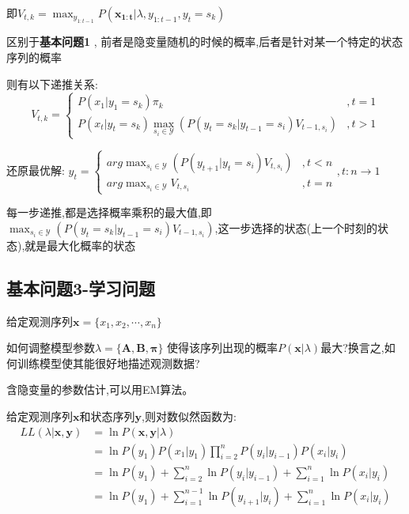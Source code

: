 \documentclass[UTF8,a4paper]{ctexart}%
\begin{document}
            即$V_{t,k} = \max_{y_{1:t-1}} P(\bm{x_{1:t}}|\lambda,y_{1:t-1} , y_t = s_k)$

            {\color{blue}
                区别于\textbf{基本问题1} , 前者是隐变量随机的时候的概率,后者是针对某一个特定的状态序列的概率
            }

            则有以下递推关系:
            \begin{equation}
                V_{t,k} = \begin{cases}
                  P(x_1|y_1 = s_k)\pi_k &,t = 1\\
                  P(x_t|y_t = s_k)\max_{s_i \in \mathcal{Y}}\left(P(y_t = s_k|y_{t-1} = s_i)V_{t-1,s_i}\right) &,t > 1
              \end{cases}
            \end{equation}

            还原最优解:
            $y_{t} = \begin{cases}
            arg \max_{s_i \in \mathcal{Y}}\left(P(y_{t+1}|y_{t} = s_i)V_{t,s_i}\right) & , t < n\\
            arg \max_{s_i \in \mathcal{Y}} V_{t,s_i} &, t = n
            \end{cases}, t:n \to 1$

            {\color{blue}
                每一步递推,都是选择概率乘积的最大值,即$\max_{s_i \in \mathcal{Y}}\left(P(y_t = s_k|y_{t-1} = s_i)V_{t-1,s_i}\right)$,这一步选择的状态(上一个时刻的状态),就是最大化概率的状态
            }

        \subsection{基本问题3-学习问题}

            给定观测序列$\bm{x} = \{x_1, x_2, \cdots , x_n\}$

            如何调整模型参数$\lambda = \{\bm{A,B,\pi}\}$ 使得该序列出现的概率$P(\bm{x} | \lambda)$最大?换言之,如何训练模型使其能很好地描述观测数据?

            {\color{blue}
                含隐变量的参数估计,可以用EM算法。
            }

            给定观测序列$\bm{x}$和状态序列$\bm{y}$,则对数似然函数为:
            \begin{equation}
              \begin{split}
              LL(\lambda|\bm{x,y}) &= \ln P(\bm{x,y}|\lambda) \\
                &= \ln P(y_1)P(x_1|y_1)\prod_{i = 2}^n P(y_i|y_{i - 1})P(x_i | y_i) \\
                &= \ln P(y_1) + \sum_{i = 2}^n \ln P(y_i|y_{i-1}) + \sum_{i = 1}^n \ln P(x_i|y_i)\\
                &= \ln P(y_1) + \sum_{i = 1}^{n-1} \ln P(y_{i+1}|y_{i}) + \sum_{i = 1}^n \ln P(x_i|y_i)
            \end{split}
            \end{equation}
\end{document}
